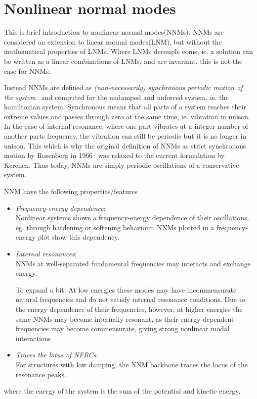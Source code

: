 
\section{Nonlinear normal modes}
\label{sec:nonl-norm-modes}

This is brief introduction to nonlinear normal modes(NNMs). NNMs are considered
an extension to linear normal modes(LNM), but without the mathematical
properties of LNMs. Where LNMs decouple eoms, ie. a solution can be written as a
linear combinations of LNMs, and are invariant, this is not the case for NNMs.

Instead NNMs are defined as \textit{(non-necessarily) synchronous periodic
  motion of the system}~\autocite{kerschen2009a} and computed for the undamped
and unforced system, ie. the hamiltonian system.
Synchronous means that all parts of a system reaches their extreme values and
passes through zero at the same time, ie. vibration in unison. In the case of
internal resonance, where one part vibrates at a integer number of another parts
frequency, the vibration can still be periodic but it is no longer in unison.
This which is why the original definition of NNMs as strict synchronous motion
by Rosenberg in 1966~\autocite{rosenberg1966a} was relaxed to the current
formulation by Kerchen. Thus today, NNMs are simply periodic oscillations of a
conservative system.

NNM have the following properties/features
\begin{itemize}
\item \textit{Frequency-energy dependence}:\\
  Nonlinear systems shows a frequency-energy dependence of their oscillations,
  eg. through hardening or softening behaviour. NNMs plotted in a
  frequency-energy plot show this dependency.
\item \textit{Internal resonances}:\\
  NNMs at well-separated fundamental frequencies may interacts and exchange
  energy.

  To expand a bit: At low energies these modes may have incommensurate natural
  frequencies and do not satisfy internal resonance conditions. Due to the
  energy dependence of their frequencies, however, at higher energies the same
  NNMs may become internally resonant, as their energy-dependent frequencies may
  become commensurate, giving strong nonlinear modal interactions
\item \textit{Traces the lotus of NFRCs}:\\
  For structures with low damping, the NNM backbone traces the locus of the
  resonance peaks.
\end{itemize}
where the energy of the system is the sum of the potential and kinetic energy.


